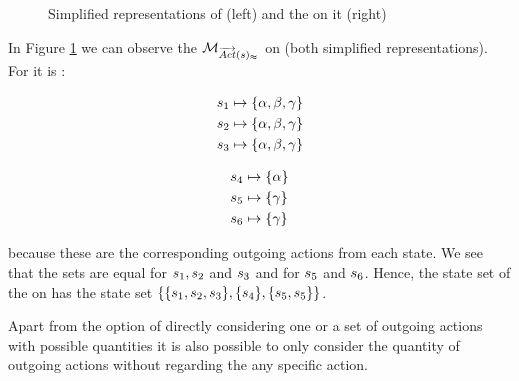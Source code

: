 \documentclass[preview]{standalone}
\begin{document}
\begin{figure}[h]
	\begin{minipage}{.5\textwidth}
		\hspace{5mm}
		
	\end{minipage}%
	\begin{minipage}{.5\textwidth}				
		\hspace{5mm}
		
	\end{minipage}	
	\caption{Simplified representations of \mdp (left) and the \viewN \viewweakoutactident on it (right)}	
	\label{fig:outActIdentWeakAfter}  	
\end{figure}

In Figure \ref{fig:outActIdentWeakAfter} we can observe the \viewN ${{{{{\mathcal{M}}}}_{{{\overrightarrow{{Act}}}({s})_\approx}}}}$ on \chgph (both simplified representations). 
For \viewweakoutactident it is \gfctweakoutactident :

\begin{minipage}{.45\textwidth}
	\begin{align*}
		{s}_1 &\mapsto \{{\alpha}, {\beta}, {\gamma}\} \\
		{s}_2 &\mapsto \{{\alpha}, {\beta}, {\gamma}\} \\
		{s}_3 &\mapsto \{{\alpha}, {\beta}, {\gamma}\} \\		
	\end{align*}
\end{minipage}
\begin{minipage}{.55\textwidth}
	\begin{align*}
		{s}_4 &\mapsto \{{\alpha}\} \\
		{s}_5 &\mapsto \{{\gamma}\} \\
		{s}_6 &\mapsto \{{\gamma}\} \\		
	\end{align*}
\end{minipage}
because these are the corresponding outgoing actions from each state. We see that the sets are equal for ${s}_1,{s}_2$ and ${s}_3$ and for ${s}_5$ and ${s}_6$. Hence, the state set of the \viewN \viewweakoutactident on \chgph has the state set $\{\{{s}_1, {s}_2, {s}_3\}, \{{s}_4\}, \{{s}_5, {s}_5\}\}$.

Apart from the option of directly considering one or a set of outgoing actions with possible quantities it is also possible to only consider the quantity of outgoing actions without regarding the any specific action.
\end{document}
